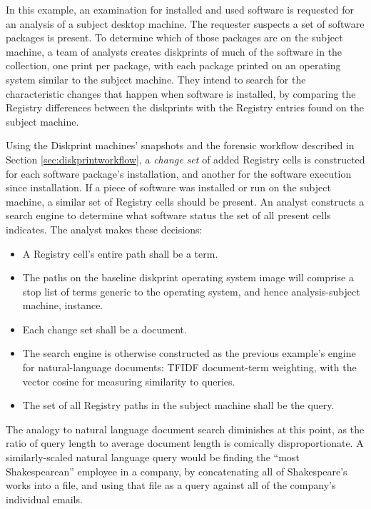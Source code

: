 \documentclass[11pt]{ucthesis}
\theoremstyle{plain}
\theoremstyle{definition}
\begin{document}
In this example, an examination for installed and used software is requested for an analysis of a subject desktop machine.  The requester suspects a set of software packages is present.  To determine which of those packages are on the subject machine, a team of analysts creates diskprints of much of the software in the collection, one print per package, with each package printed on an operating system similar to the subject machine.  They intend to search for the characteristic changes that happen when software is installed, by comparing the Registry differences between the diskprints with the Registry entries found on the subject machine.

Using the Diskprint machines' snapshots and the forensic workflow described in Section \ref{sec:diskprintworkflow}, a \emph{change set} of added Registry cells is constructed for each software package's installation, and another for the software execution since installation.  If a piece of software was installed or run on the subject machine, a similar set of Registry cells should be present.  An analyst constructs a search engine to determine what software status the set of all present cells indicates.  The analyst makes these decisions:

\begin{itemize}
\item A Registry cell's entire path shall be a term.
\item The paths on the baseline diskprint operating system image will comprise a stop list of terms generic to the operating system, and hence analysis-subject machine, instance.
\item Each change set shall be a document.
\item The search engine is otherwise constructed as the previous example's engine for natural-language documents: TFIDF document-term weighting, with the vector cosine for measuring similarity to queries.
\item The set of all Registry paths in the subject machine shall be the query.
\end{itemize}

The analogy to natural language document search diminishes at this point, as the ratio of query length to average document length is comically disproportionate.  A similarly-scaled natural language query would be finding the ``most Shakespearean'' employee in a company, by concatenating all of Shakespeare's works into a file, and using that file as a query against all of the company's individual emails.
\end{document}
